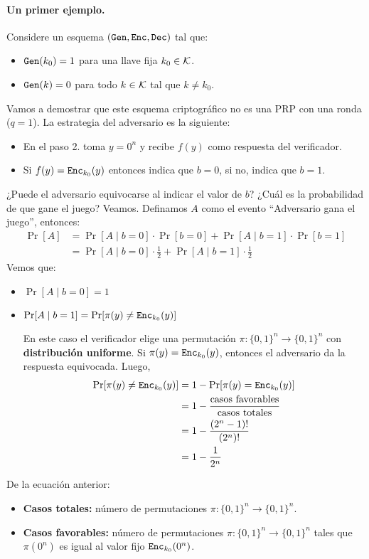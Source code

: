 \paragraph{Un primer ejemplo.} Considere un esquema $(\texttt{Gen}, \texttt{Enc}, \texttt{Dec})$ tal que:
\begin{itemize}
    \item $\texttt{Gen}(k_0) = 1$ para una llave fija $k_0 \in \mathcal{K}$.
    \item $\texttt{Gen}(k) = 0$ para todo $k \in \mathcal{K}$ tal que $k \neq k_0$.
\end{itemize}
Vamos a demostrar que este esquema criptográfico no es una PRP con una ronda ($q = 1$). La estrategia del adversario es la siguiente:
\begin{itemize}
    \item En el paso 2. toma $y = 0^n$ y recibe $f(y)$ como respuesta del verificador.
    \item Si $f(y) = \texttt{Enc}_{k_0}(y)$ entonces indica que $b = 0$, si no, indica que $b = 1$.
\end{itemize}
¿Puede el adversario equivocarse al indicar el valor de $b$? ¿Cuál es la probabilidad de que gane el juego? Veamos. Definamos $A$ como el evento ``Adversario gana el juego'', entonces:
\begin{align*}
    \Pr[A] & = \Pr[A \mid b = 0] \cdot \Pr[b = 0] + \Pr[A \mid b = 1] \cdot \Pr[b = 1]   \\
           & = \Pr[A \mid b = 0] \cdot \frac{1}{2} + \Pr[A \mid b = 1] \cdot \frac{1}{2}
\end{align*}
Vemos que:
\begin{itemize}
    \item $\Pr[A \mid b = 0] = 1$
    \item $\Pr[A \mid b = 1] = \Pr[\pi(y) \neq \texttt{Enc}_{k_0}(y)]$

          En este caso el verificador elige una permutación $\pi: \{0,1\}^n \to \{0,1\}^n$ con \textbf{distribución uniforme}. Si $\pi(y) = \texttt{Enc}_{k_0}(y)$, entonces el adversario da la respuesta equivocada. Luego,
          \begin{align*}
              \Pr[\pi(y) \neq \texttt{Enc}_{k_0}(y)] & = 1 - \Pr[\pi(y) = \texttt{Enc}_{k_0}(y)]                          \\
                                             & = 1 - \frac{\text{casos favorables}}{\text{casos totales}} \\
                                             & = 1 - \frac{(2^n - 1)!}{(2^n)!}                            \\
                                             & = 1 - \frac{1}{2^n}
          \end{align*}
\end{itemize}
De la ecuación anterior:
\begin{itemize}
    \item \textbf{Casos totales:} número de permutaciones $\pi: \{0,1\}^n \to \{0,1\}^n$.
    \item \textbf{Casos favorables:} número de permutaciones $\pi: \{0,1\}^n \to \{0,1\}^n$ tales que $\pi(0^n)$ es igual al valor fijo $\texttt{Enc}_{k_0}(0^n)$.
\end{itemize}

